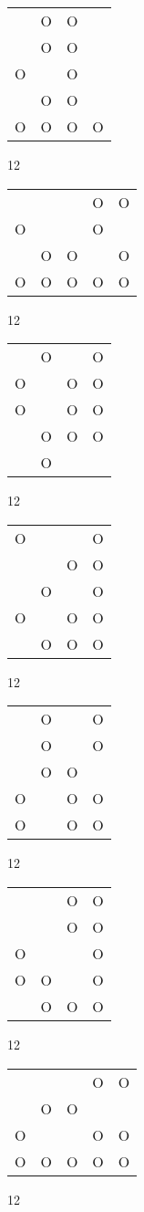 \begin{tabular}{|m{0.2cm}m{0.2cm}m{0.2cm}m{0.2cm}|}\hline
 &O&O& \\
 &O&O& \\
O& &O& \\
 &O&O& \\
O&O&O&O\\
\hline\end{tabular}12
\begin{tabular}{|m{0.2cm}m{0.2cm}m{0.2cm}m{0.2cm}m{0.2cm}|}\hline
 & & &O&O\\
O& & &O& \\
 &O&O& &O\\
O&O&O&O&O\\
\hline\end{tabular}12
\begin{tabular}{|m{0.2cm}m{0.2cm}m{0.2cm}m{0.2cm}|}\hline
 &O& &O\\
O& &O&O\\
O& &O&O\\
 &O&O&O\\
 &O& & \\
\hline\end{tabular}12
\begin{tabular}{|m{0.2cm}m{0.2cm}m{0.2cm}m{0.2cm}|}\hline
O& & &O\\
 & &O&O\\
 &O& &O\\
O& &O&O\\
 &O&O&O\\
\hline\end{tabular}12
\begin{tabular}{|m{0.2cm}m{0.2cm}m{0.2cm}m{0.2cm}|}\hline
 &O& &O\\
 &O& &O\\
 &O&O& \\
O& &O&O\\
O& &O&O\\
\hline\end{tabular}12
\begin{tabular}{|m{0.2cm}m{0.2cm}m{0.2cm}m{0.2cm}|}\hline
 & &O&O\\
 & &O&O\\
O& & &O\\
O&O& &O\\
 &O&O&O\\
\hline\end{tabular}12
\begin{tabular}{|m{0.2cm}m{0.2cm}m{0.2cm}m{0.2cm}m{0.2cm}|}\hline
 & & &O&O\\
 &O&O& & \\
O& & &O&O\\
O&O&O&O&O\\
\hline\end{tabular}12
